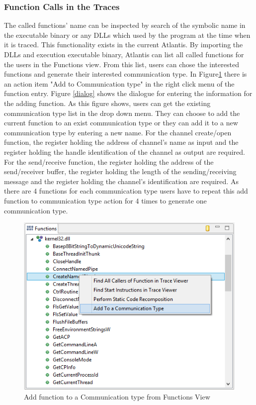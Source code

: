 \subsubsection{Function Calls in the Traces}
The called functions' name can be inspected  by  search of the symbolic name in the executable binary or any DLLs which used by the program at the time when it is traced. This functionality exists in the current Atlantis. By importing the DLLs and execution  executable binary, Atlantis can list all called functions for the users in the Functions view. From this list, users can chose the interested functions and generate their interested communication type. In Figure\ref{functionsview} there is  an action item "Add to Communication type" in the right click menu of the function entry. Figure \ref{dialog} shows the dialogue for entering the information for the adding function. As this figure shows, users can get the existing communication type list in the drop down menu. They can choose to add the current function to an exist communication type or they can add it to a new communication type by entering a new name. For the channel create/open function, the register holding the address of channel's name as input and the register holding the handle identification of the channel as output are required. For the send/receive function, the register holding the address of the send/receiver buffer, the register holding the length of the sending/receiving message and the register holding the channel's identification are required. As there are 4 functions for each communication type users have to repeat this add function to communication type action for 4 times to generate one communication type.

\begin{figure}[h]
\includegraphics{Figures/functionsview}
 \caption{Add function to a Communication type from Functions View}
\label{functionsview}
\end{figure}

